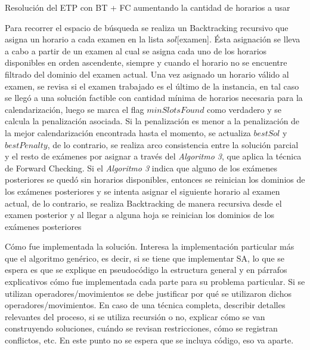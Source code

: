 \documentclass[letter, 10pt]{article}
\begin{document}
\begin{algorithm}[H]
\SetAlgoLined
{}
\caption{Resolución del ETP con BT + FC aumentando la cantidad de horarios a usar}
\end{algorithm}
\vspace*{0.4cm}
Para recorrer el espacio de búsqueda se realiza un Backtracking recursivo que asigna un horario a cada examen en la lista $sol$[examen]. Ésta asignación se lleva a cabo a partir de un examen al cual se asigna cada uno de los horarios disponibles en orden ascendente, siempre y cuando el horario no se encuentre filtrado del dominio del examen actual. Una vez asignado un horario válido al examen, se revisa si el examen trabajado es el último de la instancia, en tal caso se llegó a una solución factible con cantidad mínima de horarios necesaria para la calendarización, luego se marca el flag $minSlotsFound$ como verdadero y se calcula la penalización asociada. Si la penalización es menor a la penalización de la mejor calendarización encontrada hasta el momento, se actualiza $bestSol$ y $bestPenalty$, de lo contrario, se realiza arco consistencia entre la solución parcial y el resto de exámenes por asignar a través del \textit{Algoritmo 3}, que aplica la técnica de Forward Checking. Si el \textit{Algoritmo 3} indica que alguno de los exámenes posteriores se quedó sin horarios disponibles, entonces se reinician los dominios de los exámenes posteriores y se intenta asignar el siguiente horario al examen actual, de lo contrario, se realiza Backtracking de manera recursiva desde el examen posterior y al llegar a alguna hoja se reinician los dominios de los exámenes posteriores

C\'omo fue implementada la soluci\'on. Interesa la implementaci\'on particular m\'as que el algoritmo gen\'erico, es decir, si se tiene que implementar SA, lo que se espera es que se explique en pseudoc\'odigo la estructura
general y en p\'arrafos explicativos c\'omo fue implementada cada parte para su problema particular. Si
se utilizan operadores/movimientos se debe justificar por qu\'e se utilizaron dichos operadores/movimientos. 
En caso de una t\'ecnica completa, describir detalles relevantes del proceso, si se utiliza recursi\'on o no, explicar c\'omo se van construyendo soluciones, cu\'ando se revisan restricciones, c\'omo se registran conflictos, etc. En este punto no se espera que se incluya c\'odigo, eso va aparte.
\end{document}
